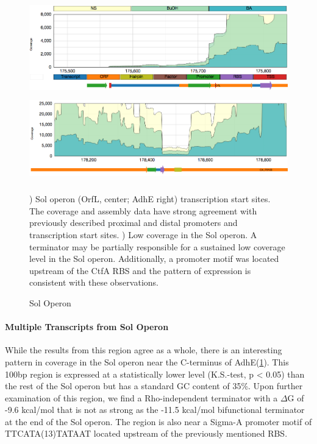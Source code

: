 \begin{figure}
\small
{\includegraphics[width=\textwidth,height=1.5in]{images/Assembly/Examples/Sol/Sol-TSS.png}
\label{fig:3a}}
{\includegraphics[width=\textwidth,height=1.5in]{images/Assembly/Examples/Sol/AdhE-terminator.png}
\label{fig:3b}}
\caption{Sol Operon}
) Sol operon (OrfL, center; AdhE right) transcription start sites. The coverage and assembly data have strong agreement with previously described proximal and distal promoters and transcription start sites. ) Low coverage in the Sol operon. A terminator may be partially responsible for a sustained low coverage level in the Sol operon. Additionally, a promoter motif was located upstream of the CtfA RBS and the pattern of expression is consistent with these observations.
\end{figure}

\paragraph{Multiple Transcripts from Sol Operon}
While the results from this region agree as a whole, there is an interesting pattern in coverage in the Sol operon near the C-terminus of AdhE(\ref{fig:3b}). This 100bp region is expressed at a statistically lower level (K.S.-test, p < 0.05) than the rest of the Sol operon but has a standard GC content of 35\%. Upon further examination of this region, we find a Rho-independent terminator with a \(\Delta\)G of -9.6 kcal/mol that is not as strong as the -11.5 kcal/mol bifunctional terminator at the end of the Sol operon. The region is also near a Sigma-A promoter motif of TTCATA(13)TATAAT located upstream of the previously mentioned RBS. 

